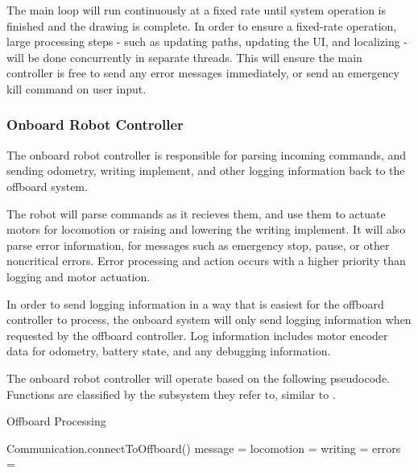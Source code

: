The main loop will run continuously at a fixed rate until system operation is finished and the drawing is complete. In order to ensure a fixed-rate operation, large processing steps - such as updating paths, updating the UI, and localizing - will be done concurrently in separate threads. This will ensure the main controller is free to send any error messages immediately, or send an emergency kill command on user input.


\subsubsection{Onboard Robot Controller}
\label{sec:software_full_onboard}
The onboard robot controller is responsible for parsing incoming commands, and sending odometry, writing implement, and other logging information back to the offboard system.

The robot will parse commands as it recieves them, and use them to actuate motors for locomotion or raising and lowering the writing implement. It will also parse error information, for messages such as emergency stop, pause, or other noncritical errors. Error processing and action occurs with a higher priority than logging and motor actuation.

In order to send logging information in a way that is easiest for the offboard controller to process, the onboard system will only send logging information when requested by the offboard controller. Log information includes motor encoder data for odometry, battery state, and any debugging information.

The onboard robot controller will operate based on the following pseudocode. Functions are classified by the subsystem they refer to, similar to .

\begin{algorithm}[t!]
\caption{Offboard Processing}\label{algo:offboard}
\begin{algorithmic}[1]  
\State Communication.connectToOffboard()
  \State message = 
  \State locomotion = 
  \State writing = 
  \State errors = 

  \State {}
	\State {}
  \EndIf 

  \State {}
	\State {}
  \EndIf

  \State {}
  \State {}

  \State {}
  \State {}

  \State {}
  \EndIf
    
\EndProcedure
\end{algorithmic}
\end{algorithm}




